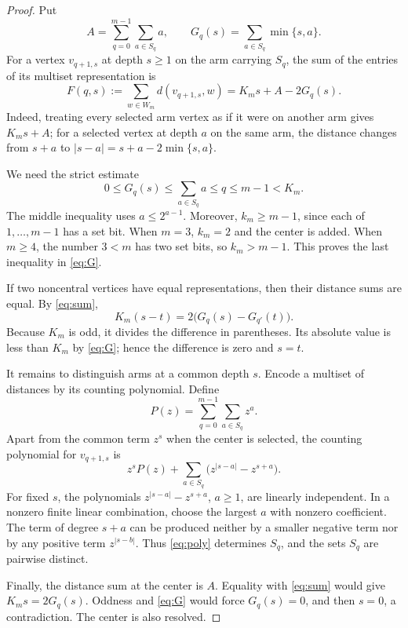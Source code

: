 \documentclass[11pt]{amsart}
\theoremstyle{definition}
\begin{document}
\begin{proof}
Put
\[
 A=\sum_{q=0}^{m-1}\sum_{a\in S_q}a,
 \qquad
 G_q(s)=\sum_{a\in S_q}\min\{s,a\}.
\]
For a vertex \(v_{q+1,s}\) at depth \(s\ge1\) on the arm carrying \(S_q\),
the sum of the entries of its multiset representation is
\begin{equation}
 F(q,s):=\sum_{w\in W_m}d(v_{q+1,s},w)
       =K_ms+A-2G_q(s).                                    \label{eq:sum}
\end{equation}
Indeed, treating every selected arm vertex as if it were on another arm
gives \(K_ms+A\); for a selected vertex at depth \(a\) on the same arm, the
distance changes from \(s+a\) to \(|s-a|=s+a-2\min\{s,a\}\).

We need the strict estimate
\begin{equation}
 0\le G_q(s)\le\sum_{a\in S_q}a\le q\le m-1<K_m.            \label{eq:G}
\end{equation}
The middle inequality uses \(a\le2^{a-1}\).  Moreover,
\(k_m\ge m-1\), since each of \(1,\ldots,m-1\) has a set bit.  When \(m=3\),
\(k_m=2\) and the center is added.  When \(m\ge4\), the number \(3<m\) has
two set bits, so \(k_m>m-1\).  This proves the last inequality in
\eqref{eq:G}.

If two noncentral vertices have equal representations, then their distance
sums are equal.  By \eqref{eq:sum},
\[
 K_m(s-t)=2\bigl(G_q(s)-G_{q'}(t)\bigr).
\]
Because \(K_m\) is odd, it divides the difference in parentheses.  Its
absolute value is less than \(K_m\) by \eqref{eq:G}; hence the difference is
zero and \(s=t\).

It remains to distinguish arms at a common depth \(s\).  Encode a multiset of
distances by its counting polynomial.  Define
\[
 P(z)=\sum_{q=0}^{m-1}\sum_{a\in S_q}z^a.
\]
Apart from the common term \(z^s\) when the center is selected, the counting
polynomial for \(v_{q+1,s}\) is
\begin{equation}
 z^sP(z)+\sum_{a\in S_q}\bigl(z^{|s-a|}-z^{s+a}\bigr).
                                                               \label{eq:poly}
\end{equation}
For fixed \(s\), the polynomials
\(z^{|s-a|}-z^{s+a}\), \(a\ge1\), are linearly independent.  In a nonzero
finite linear combination, choose the largest \(a\) with nonzero coefficient.
The term of degree \(s+a\) can be produced neither by a smaller negative term
nor by any positive term \(z^{|s-b|}\).  Thus \eqref{eq:poly} determines
\(S_q\), and the sets \(S_q\) are pairwise distinct.

Finally, the distance sum at the center is \(A\).  Equality with
\eqref{eq:sum} would give \(K_ms=2G_q(s)\).  Oddness and \eqref{eq:G} would
force \(G_q(s)=0\), and then \(s=0\), a contradiction.  The center is also
resolved.
\end{proof}
\end{document}

